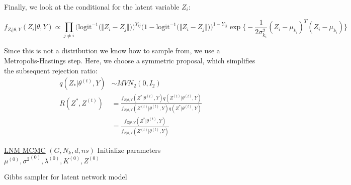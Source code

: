 \documentclass{article}
\begin{document}
Finally, we look at the conditional for the latent variable $Z_i$:

\[f_{Z_i | \theta, Y}(Z_i | \theta, Y) \propto \prod_{j \neq i}\Big(\text{logit}^{-1}\big(\Vert Z_i-Z_j\Vert)\Big)^{Y_{ij}}\Big(1 - \text{logit}^{-1}\big(\Vert Z_i-Z_j\Vert)\Big)^{1 - Y_{ij}} \exp\Big\{-\frac{1}{2\sigma_{k_i}^2}(Z_i - \mu_{k_i})^T( Z_i - \mu_{k_i}) \Big\}\]

Since this is not a distribution we know how to sample from, we use a Metropolis-Hastings step. Here, we choose a symmetric proposal, which simplifies the subsequent rejection ratio:
\begin{align*}
q(Z_* | \theta^{(t)}, Y) &\sim MVN_2(0, I_2) \\
R(Z^*, Z^{(t)}) &= \frac{f_{Z | \theta, Y}(Z^* | \theta^{(t)}, Y)q(Z^{(t)} | \theta^{(t)}, Y)}{f_{Z | \theta, Y}(Z^{(t)} | \theta^{(t)}, Y)q(Z^* | \theta^{(t)}, Y)} \\
&= \frac{f_{Z | \theta, Y}(Z^* | \theta^{(t)}, Y)}{f_{Z | \theta, Y}(Z^{(t)} | \theta^{(t)}, Y)} 
\end{align*}

\begin{algorithm*}
    \underline{LNM MCMC} $(G, N_k, d, ns)$\;
    Initialize  parameters $\mu^{(0)}, {\sigma^2}^{(0)}, \lambda^{(0)}, K^{(0)}, Z^{(0)}$\;
     {
   }

    \caption{Gibbs sampler for latent network model}
\end{algorithm*}
\end{document}
